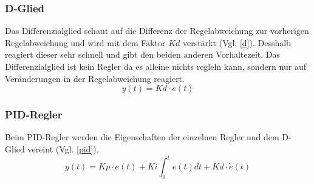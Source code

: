\documentclass[12pt,a4paper, ngerman]{article}
\begin{document}
\subsubsection{D-Glied}
Das Differenzialglied schaut auf die Differenz der Regelabweichung zur vorherigen Regelabweichung und wird mit dem Faktor $Kd$ verstärkt (Vgl. \ref{d}). Desshalb reagiert dieser sehr schnell und gibt den beiden anderen Vorhaltezeit. Das Differenzialglied ist kein Regler da es alleine nichts regleln kann, sondern nur auf Veränderungen in der Regelabweichung reagiert.\cite{website:rn-wissen_Regelungstechnik}\\
\begin{equation}\label{d}
y(t)=Kd\cdot \dot{e}(t)
\end{equation}

\subsubsection{PID-Regler}
Beim PID-Regler werden die Eigenschaften der einzelnen Regler und dem D-Glied vereint (Vgl. \ref{pid}).
\begin{equation}\label{pid}
y(t)=Kp\cdot e(t)+Ki\int_{0}^{t}e(t)dt+Kd\cdot \dot{e}(t)
\end{equation}
\newpage
\end{document}
